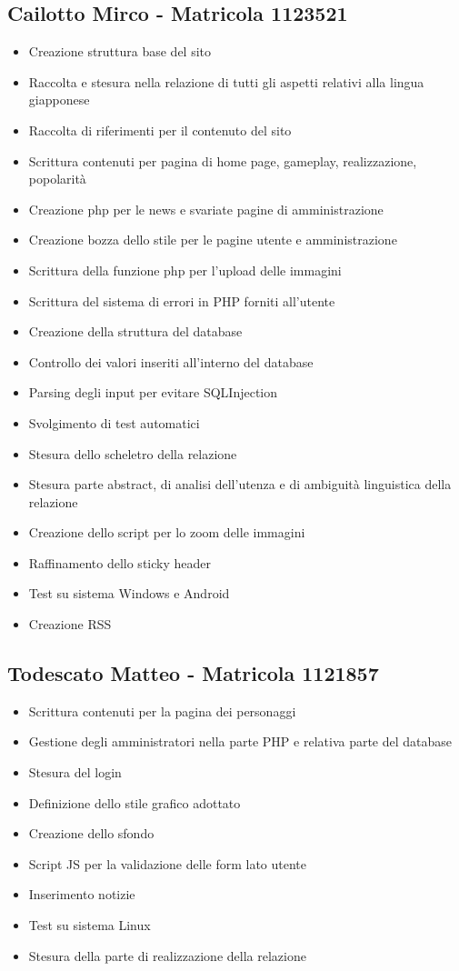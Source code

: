 \documentclass[openany, a4paper, 12pt]{report}
\begin{document}
	\subsection{Cailotto Mirco - Matricola 1123521}
	\begin{itemize}
		\item Creazione struttura base del sito
		\item Raccolta e stesura nella relazione di tutti gli aspetti relativi alla lingua giapponese
		\item Raccolta di riferimenti per il contenuto del sito
		\item Scrittura contenuti per pagina di home page, gameplay, realizzazione, popolarità
		\item Creazione php per le news e svariate pagine di amministrazione
		\item Creazione bozza dello stile per le pagine utente e amministrazione
		\item Scrittura della funzione php per l'upload delle immagini
		\item Scrittura del sistema di errori in PHP forniti all'utente
		\item Creazione della struttura del database
		\item Controllo dei valori inseriti all'interno del database
		\item Parsing degli input per evitare SQLInjection
		\item Svolgimento di test automatici
		\item Stesura dello scheletro della relazione
		\item Stesura parte abstract, di analisi dell'utenza e di ambiguità linguistica della relazione
		\item Creazione dello script per lo zoom delle immagini
		\item Raffinamento dello sticky header
		\item Test su sistema Windows e Android
		\item Creazione RSS
	\end{itemize}
	\subsection{Todescato Matteo - Matricola 1121857}
	\begin{itemize}
		\item Scrittura contenuti per la pagina dei personaggi
		\item Gestione degli amministratori nella parte PHP e relativa parte del database
		\item Stesura del login
		\item Definizione dello stile grafico adottato
		\item Creazione dello sfondo
		\item Script JS per la validazione delle form lato utente
		\item Inserimento notizie
		\item Test su sistema Linux
		\item Stesura della parte di realizzazione della relazione
	\end{itemize}
\end{document}
